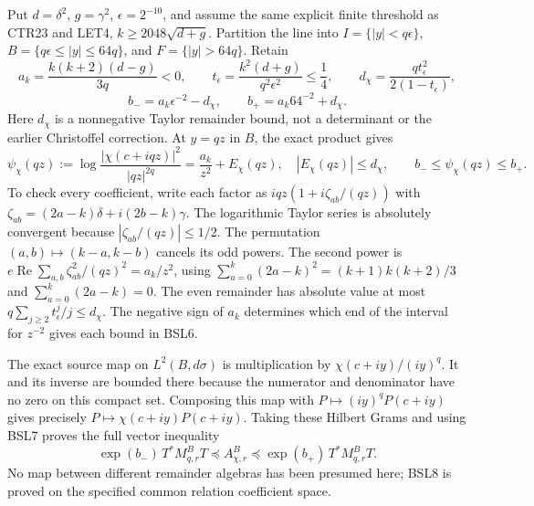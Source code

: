 \documentclass[11pt,a4paper]{article}
\begin{document}
Put $d=\delta^2$, $g=\gamma^2$, $\epsilon=2^{-10}$, and assume
the same explicit finite threshold as CTR23 and LET4,
$k\geq2048\sqrt{d+g}$. Partition the line into
$I=\{|y|<q\epsilon\}$, $B=\{q\epsilon\leq|y|\leq64q\}$,
and $F=\{|y|>64q\}$. Retain
\[
 a_k=\frac{k(k+2)(d-g)}{3q}<0,\qquad
 t_\epsilon=\frac{k^2(d+g)}{q^2\epsilon^2}\leq\frac14,\qquad
 d_\chi=\frac{qt_\epsilon^2}{2(1-t_\epsilon)},
\]
\[
 b_- =a_k\epsilon^{-2}-d_\chi,\qquad
 b_+ =a_k64^{-2}+d_\chi.
 \tag{BSL6}
\]
Here $d_\chi$ is a nonnegative Taylor remainder bound, not a
determinant or the earlier Christoffel correction. At $y=qz$ in $B$,
the exact product gives
\[
 \psi_\chi(qz):=\log\frac{|\chi(c+iqz)|^2}{|qz|^{2q}}
       =\frac{a_k}{z^2}+E_\chi(qz),\quad |E_\chi(qz)|\leq d_\chi,
 \qquad b_-\leq\psi_\chi(qz)\leq b_+.
 \tag{BSL7}
\]
To check every coefficient, write each factor as
$iqz(1+i\zeta_{ab}/(qz))$ with
$\zeta_{ab}=(2a-k)\delta+i(2b-k)\gamma$. The logarithmic Taylor
series is absolutely convergent because $|\zeta_{ab}/(qz)|\leq1/2$.
The permutation $(a,b)\mapsto(k-a,k-b)$ cancels its odd powers.
The second power is
$e\operatorname{Re}\sum_{a,b}\zeta_{ab}^2/(qz)^2=a_k/z^2$,
using $\sum_{a=0}^k(2a-k)^2=(k+1)k(k+2)/3$ and
$\sum_{a=0}^k(2a-k)=0$. The even remainder has absolute value at
most $q\sum_{j\geq2}t_\epsilon^j/j\leq d_\chi$.
The negative sign of $a_k$ determines which end of the interval for
$z^{-2}$ gives each bound in BSL6.

The exact source map on $L^2(B,d\sigma)$ is multiplication by
$\chi(c+iy)/(iy)^q$. It and its inverse are bounded there because
the numerator and denominator have no zero on this compact set.
Composing this map with $P\mapsto(iy)^qP(c+iy)$ gives precisely
$P\mapsto\chi(c+iy)P(c+iy)$. Taking these Hilbert Grams and using
BSL7 proves the full vector inequality
\[
 \exp(b_-)\,T^*M_{q,r}^BT
 \preceq A_{\chi,r}^B
 \preceq\exp(b_+)\,T^*M_{q,r}^BT.
 \tag{BSL8}
\]
No map between different remainder algebras has been presumed here;
BSL8 is proved on the specified common relation coefficient space.
\end{document}
